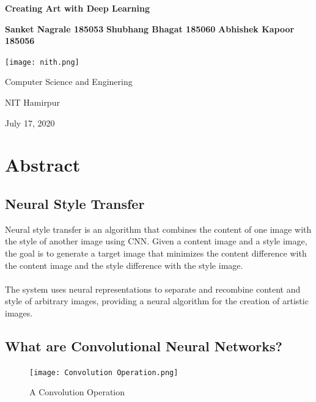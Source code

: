 \documentclass[oneside]{book}
\begin{document}
\begin{titlepage}
    \begin{center}
        \vspace*{1cm}
            
        \Huge
        \textbf{Creating Art with Deep Learning}
            
        \vspace{0.5cm}
        \LARGE
        \vspace{1.5cm}
            
        \textbf{Sanket Nagrale 185053}
        \hspace{8cm}
        \textbf{Shubhang Bhagat 185060}
        \hspace{8cm}
		\textbf{Abhishek Kapoor 185056}
        
            
        \vspace{0.8cm}
            
        \texttt{[image: nith.png]}
       
        \vspace{2cm}
        \LARGE
        Computer Science and Enginering

        NIT Hamirpur

		July 17, 2020
            
    \end{center}
\end{titlepage}
\chapter*{Abstract}
\section*{Neural Style Transfer}
\Large
Neural style transfer is an algorithm that combines the content of one image with the style of another image using CNN. Given a content image and a style image, the goal is to generate a target image that minimizes the content difference with the content image and the style difference with the style image.\cite{gatys2015neural}
\\
\\
The system uses neural representations to separate and recombine content and style of arbitrary images, providing a neural algorithm for the creation of artistic images.
\section*{What are Convolutional Neural Networks?}
\begin{figure}[h]
\centering
\texttt{[image: Convolution Operation.png]}
{\caption*{A Convolution Operation}}
\end{figure}
\pagebreak
\end{document}
